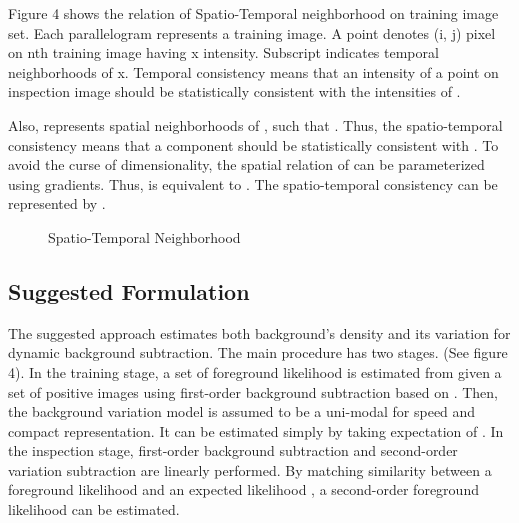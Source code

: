 \documentclass[a4paper,twocolumn, 10pt]{article}
\begin{document}
Figure 4 shows the relation of Spatio-Temporal neighborhood on training image set. Each parallelogram represents a training image. A point   denotes (i, j) pixel on nth training image having x intensity. Subscript indicates temporal neighborhoods of x. Temporal consistency means that an intensity of a point   on inspection image should be statistically consistent with the intensities of  . 

Also,   represents spatial neighborhoods of  , such that  . Thus, the spatio-temporal consistency means that a component   should be statistically consistent with  . To avoid the curse of dimensionality, the spatial relation of   can be parameterized using gradients. Thus,   is equivalent to  . The spatio-temporal consistency can be represented by  . 

\begin{figure}[t]
  \centering
  \label{fig40}
  \hfill
  \caption{Spatio-Temporal Neighborhood}
\end{figure}


\subsection{Suggested Formulation}
The suggested approach estimates both background’s density and its variation for dynamic background subtraction. The main procedure has two stages. (See figure 4). In the training stage, a set of foreground likelihood   is estimated from given a set of positive images   using first-order background subtraction based on  . Then, the background variation model is assumed to be a uni-modal for speed and compact representation. It can be estimated simply by taking expectation of  . In the inspection stage, first-order background subtraction and second-order variation subtraction are linearly performed. By matching similarity between a foreground likelihood   and an expected likelihood  , a second-order foreground likelihood   can be estimated.
\end{document}
